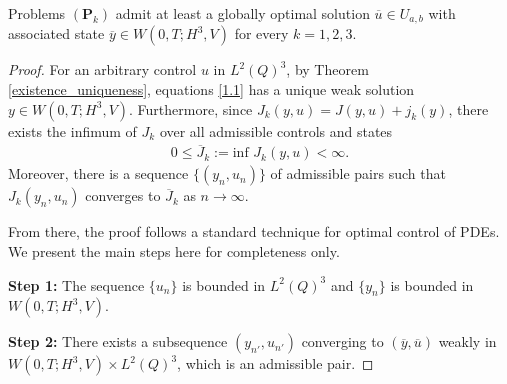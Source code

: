 \documentclass[reqno]{amsart}
\begin{document}
	\begin{theorem}\label{theo3.1}
		Problems $(\textbf{P}_k)$  admit at least a globally optimal solution $\overline{u} \in U_{a,b}$ with associated state $\overline{y} \in W(0,T;H^3,V)$  for every $k=1,2,3$.
	\end{theorem}
	
	\begin{proof}
		For an arbitrary control $u$ in $L^2(Q)^3$, by Theorem \ref{existence_uniqueness},  equations \eqref{1.1} has a unique weak solution $y \in W(0,T;H^3,V)$. Furthermore, since $J_k(y,u) = J(y,u) +j_k(y)$, there exists the infimum of $J_k$ over all admissible controls and states
		\begin{align*}
			0\leq \overline{J}_k:= \text{inf } J_k(y,u) < \infty.
		\end{align*}
		Moreover, there is a sequence $\{(y_n,u_n)\}$ of admissible pairs such that $J_k(y_n,u_n)$ converges to $\overline{J}_k$ as $n \rightarrow \infty$. 
		
		From there, the proof follows a standard technique for optimal control of PDEs. We present the main steps here for completeness only. 
		
		\textbf{Step 1:} The sequence $\{u_n\}$ is bounded in $L^2(Q)^3$ and $\{y_n\}$ is bounded in $W(0,T;H^3,V)$.
		
		\textbf{Step 2:} There exists a subsequence $(y_{n'},u_{n'})$ converging to $(\overline{y},\overline{u})$ weakly in $W(0,T;H^3,V)\times L^2(Q)^3$, which is an admissible pair.
		

\end{proof}
\end{document}
